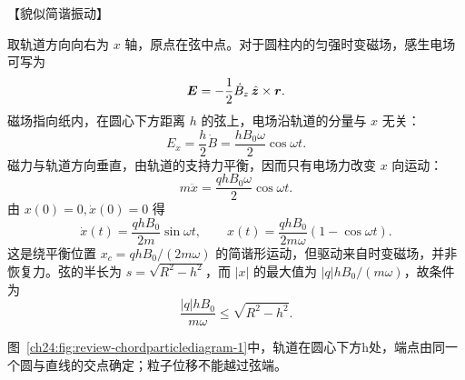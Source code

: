 {\begin{origexamplebox}{【貌似简谐振动】}
%
\begin{center}\end{center}
\end{origexamplebox}

\begin{xesolution}
取轨道方向向右为 $x$ 轴，原点在弦中点。对于圆柱内的匀强时变磁场，感生电场可写为
\begin{equation}
  \bm{E}=-\frac12\dot B_z\,\hat{\bm{z}}\times\bm{r}.
\end{equation}
磁场指向纸内，在圆心下方距离 $h$ 的弦上，电场沿轨道的分量与 $x$ 无关：
\begin{equation}
  E_x=\frac h2\dot B=\frac{hB_0\omega}{2}\cos\omega t.
\end{equation}
磁力与轨道方向垂直，由轨道的支持力平衡，因而只有电场力改变 $x$ 向运动：
\begin{equation}
  m\ddot x=\frac{qhB_0\omega}{2}\cos\omega t.
\end{equation}
由 $x(0)=0,\dot x(0)=0$ 得
\begin{equation}
  \boxed{\dot x(t)=\frac{qhB_0}{2m}\sin\omega t},
  \qquad
  \boxed{x(t)=\frac{qhB_0}{2m\omega}(1-\cos\omega t)}.
\end{equation}
这是绕平衡位置 $x_c=qhB_0/(2m\omega)$ 的简谐形运动，但驱动来自时变磁场，并非恢复力。弦的半长为
$s=\sqrt{R^2-h^2}$，而 $|x|$ 的最大值为 $|q|hB_0/(m\omega)$，故条件为
\begin{equation}
  \boxed{\frac{|q|hB_0}{m\omega}\le\sqrt{R^2-h^2}}.
\end{equation}

图~\ref{ch24:fig:review-chordparticlediagram-1}中，轨道在圆心下方h处，端点由同一个圆与直线的交点确定；粒子位移不能越过弦端。
\par\noindent\begin{minipage}{\linewidth}
\chordParticleDiagram
{}
\end{minipage}\par\medskip
\end{xesolution}



}
